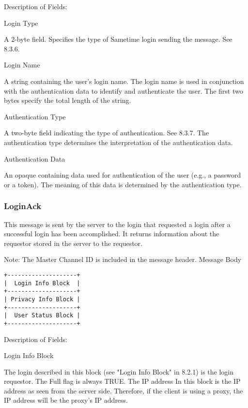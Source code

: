 \documentclass[titlepage,oneside]{book}
\begin{document}
\par{} Description of Fields:

\par{} Login Type

\subpar{}   A 2-byte field. Specifies the type of Sametime login sending the
  message. See 8.3.6.

\par{} Login Name

\subpar{}  A string containing the user's login name. The login name is used in
  conjunction with the authentication data to identify and
  authenticate the user. The first two bytes specify the total length
  of the string.

\par{} Authentication Type

\subpar{}  A two-byte field indicating the type of authentication. See 
  8.3.7. The authentication type determines the 
  interpretation of the authentication data.

\par{} Authentication Data

\subpar{}  An opaque containing data used for authentication of the user (e.g.,
  a password or a token). The meaning of this data is determined by
  the authentication type.

\subsubsection{LoginAck}

\par{} This message is sent by the server to the login that requested a
login after a successful login has been accomplished. It returns
information about the requestor stored in the server to the requestor.

\par{} Note: The Master Channel ID is included in the message header.
Message Body

\begin{verbatim}
+--------------------+
|  Login Info Block  |
+--------------------+
| Privacy Info Block |
+--------------------+
|  User Status Block |
+--------------------+
\end{verbatim}

\par{} Description of Fields:

\par{} Login Info Block

\subpar{}  The login described in this block (see "Login Info Block" in
  8.2.1) is the login requestor. The Full flag is always TRUE.
  The IP address
  In this block is the IP address as seen from the server side.
  Therefore, if the client is using a proxy, the IP address will be
  the proxy's IP address.
\end{document}
